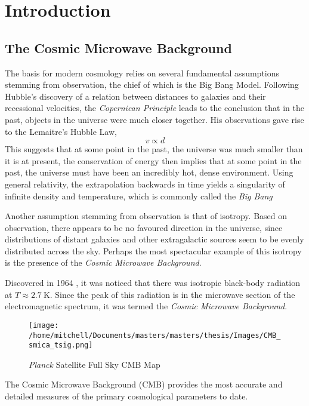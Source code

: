 \chapter{Introduction}
\section{The Cosmic Microwave Background}
The basis for modern cosmology relies on several fundamental assumptions stemming from observation, the chief of which is the Big Bang Model. Following Hubble's discovery of a relation between distances to galaxies and their recessional velocities, the \emph{Copernican Principle} leads to the conclusion that in the past, objects in the universe were much closer together. His observations gave rise to the Lemaitre's Hubble Law,
\begin{equation}
	v  \varpropto d
	\label{eq:HubbleLaw}
\end{equation}
This suggests that at some point in the past, the universe was much smaller than it is at present, the conservation of energy then implies that at some point in the past, the universe must have been an incredibly hot, dense environment. Using general relativity, the extrapolation backwards in time yields a singularity of infinite density and temperature, which is commonly called the \emph{Big Bang}
\par Another assumption stemming from observation is that of isotropy. Based on observation, there appears to be no favoured direction in the universe, since distributions of distant galaxies and other extragalactic sources seem to be evenly distributed across the sky. Perhaps the most spectacular example of this isotropy is the presence of the \emph{Cosmic Microwave Background}.
\par Discovered in 1964 \citep{Penzias:65}, it was noticed that there was isotropic black-body radiation at $T \approx \SI{2.7}{\kelvin}$. Since the peak of this radiation is in the microwave section of the electromagnetic spectrum, it was termed the \emph{Cosmic Microwave Background}.
\begin{figure}[ht]
	\centering
	\texttt{[image: /home/mitchell/Documents/masters/masters/thesis/Images/CMB\_smica\_tsig.png]}
	\label{CMB Map}
	\caption{\emph{Planck} Satellite Full Sky CMB Map}
\end{figure}

The Cosmic Microwave Background (CMB) provides the most accurate and detailed measures of the primary cosmological parameters to date. 


